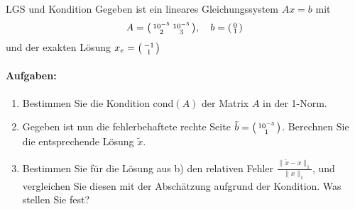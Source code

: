 \begin{example2}{LGS und Kondition}
Gegeben ist ein lineares Gleichungssystem $Ax = b$ mit
$$A = \begin{psmallmatrix}
10^{-5} & 10^{-5}\\
2 & 3
\end{psmallmatrix}, \quad
b = \begin{psmallmatrix}
0\\
1
\end{psmallmatrix}$$
und der exakten Lösung $x_e = \begin{psmallmatrix}-1\\1\end{psmallmatrix}$

\paragraph{Aufgaben:}
\begin{enumerate}
    \item Bestimmen Sie die Kondition cond$(A)$ der Matrix $A$ in der 1-Norm.
    
    \item Gegeben ist nun die fehlerbehaftete rechte Seite $\tilde{b} = \begin{psmallmatrix}10^{-5}\\1\end{psmallmatrix}$. Berechnen Sie die entsprechende Lösung $\tilde{x}$.
    
    \item Bestimmen Sie für die Lösung aus b) den relativen Fehler $\frac{\|\tilde{x}-x\|_1}{\|x\|_1}$, und vergleichen Sie diesen mit der Abschätzung aufgrund der Kondition. Was stellen Sie fest?
\end{enumerate}
\end{example2}

